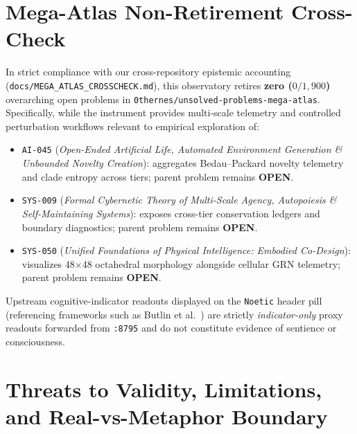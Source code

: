 \documentclass[11pt,reqno]{amsart}
\theoremstyle{definition}
\newcommand{\code}[1]{{\footnotesize\nolinkurl{#1}}}
\begin{document}
\section{Mega-Atlas Non-Retirement Cross-Check}
\label{sec:megaatlas}

In strict compliance with our cross-repository epistemic accounting (\code{docs/MEGA\_ATLAS\_CROSSCHECK.md}), this observatory retires \textbf{zero ($0 / 1{,}900$)} overarching open problems in \code{0thernes/unsolved-problems-mega-atlas}. Specifically, while the instrument provides multi-scale telemetry and controlled perturbation workflows relevant to empirical exploration of:
\begin{itemize}[leftmargin=1.5em,itemsep=2pt]
  \item \code{AI-045} (\emph{Open-Ended Artificial Life, Automated Environment Generation \& Unbounded Novelty Creation}): aggregates Bedau--Packard novelty telemetry and clade entropy across tiers; parent problem remains \textbf{OPEN}.
  \item \code{SYS-009} (\emph{Formal Cybernetic Theory of Multi-Scale Agency, Autopoiesis \& Self-Maintaining Systems}): exposes cross-tier conservation ledgers and boundary diagnostics; parent problem remains \textbf{OPEN}.
  \item \code{SYS-050} (\emph{Unified Foundations of Physical Intelligence: Embodied Co-Design}): visualizes 48$\times$48 octahedral morphology alongside cellular GRN telemetry; parent problem remains \textbf{OPEN}.
\end{itemize}
Upstream cognitive-indicator readouts displayed on the \code{Noetic} header pill (referencing frameworks such as Butlin et al.~\cite{butlin2023}) are strictly \emph{indicator-only} proxy readouts forwarded from \code{:8795} and do not constitute evidence of sentience or consciousness.

\section{Threats to Validity, Limitations, and Real-vs-Metaphor Boundary}
\label{sec:limitations}
\end{document}
